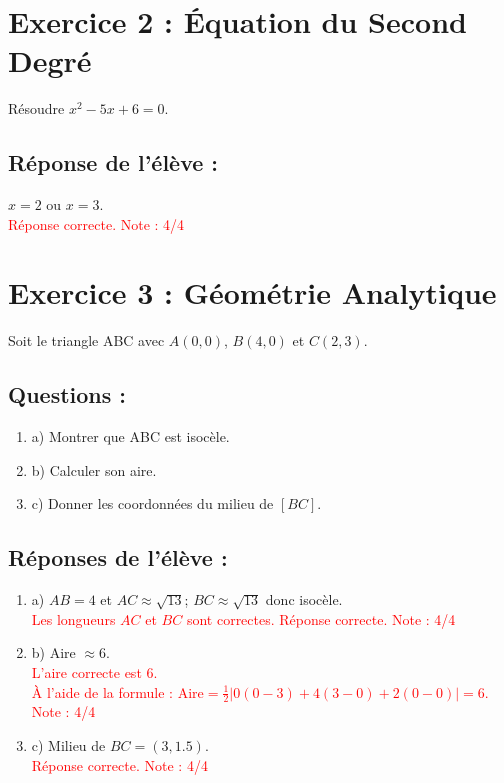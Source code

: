 \documentclass{article}
\begin{document}
\section*{Exercice 2 : Équation du Second Degré}

Résoudre $x^2 - 5x + 6 = 0$. 

\subsection*{Réponse de l’élève :}
$x = 2$ ou $x = 3$.\\
\textcolor{red}{Réponse correcte. Note : 4/4}

\section*{Exercice 3 : Géométrie Analytique}

Soit le triangle ABC avec $A(0,0)$, $B(4,0)$ et $C(2,3)$. 

\subsection*{Questions :}
\begin{enumerate}
    \item a) Montrer que ABC est isocèle.
    \item b) Calculer son aire.
    \item c) Donner les coordonnées du milieu de $[BC]$.
\end{enumerate}

\subsection*{Réponses de l’élève :}
\begin{enumerate}
    \item a) $AB = 4$ et $AC \approx \sqrt{13}$; $BC \approx \sqrt{13}$ donc isocèle. \\
    \textcolor{red}{Les longueurs $AC$ et $BC$ sont correctes. Réponse correcte. Note : 4/4}
    
    \item b) Aire $\approx 6$. \\
    \textcolor{red}{L'aire correcte est $6$. \\
    À l'aide de la formule : $\text{Aire} = \frac{1}{2} \left| 0(0-3) + 4(3-0) + 2(0-0) \right| = 6$. \\
    Note : 4/4}
    
    \item c) Milieu de $BC = (3, 1.5)$. \\
    \textcolor{red}{Réponse correcte. Note : 4/4}
\end{enumerate}
\end{document}
